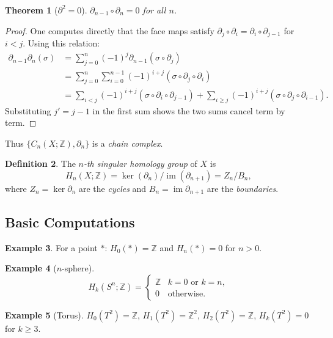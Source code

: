 \documentclass[12pt,a4paper]{amsart}
\newtheorem{theorem}{Theorem}[section]
\theoremstyle{definition}
\newtheorem{definition}[theorem]{Definition}
\newtheorem{example}[theorem]{Example}
\begin{document}
\begin{theorem}[$\partial^2 = 0$]
$\partial_{n-1} \circ \partial_n = 0$ for all $n$.
\end{theorem}
\begin{proof}
One computes directly that the face maps satisfy
$\partial_j \circ \partial_i = \partial_i \circ \partial_{j-1}$ for $i < j$.
Using this relation:
\begin{align*}
  \partial_{n-1}\partial_n(\sigma)
  &= \sum_{j=0}^n (-1)^j \partial_{n-1}(\sigma \circ \partial_j) \\
  &= \sum_{j=0}^n \sum_{i=0}^{n-1} (-1)^{i+j}
     (\sigma \circ \partial_j \circ \partial_i) \\
  &= \sum_{i < j} (-1)^{i+j}(\sigma \circ \partial_i \circ \partial_{j-1})
   + \sum_{i \geq j} (-1)^{i+j}(\sigma \circ \partial_j \circ \partial_{i-1}).
\end{align*}
Substituting $j' = j-1$ in the first sum shows the two sums cancel term by term.
\end{proof}

Thus $\{C_n(X;\mathbb{Z}), \partial_n\}$ is a \emph{chain complex}.

\begin{definition}
The \emph{$n$-th singular homology group} of $X$ is
\[
  H_n(X;\mathbb{Z})
  = \ker(\partial_n) / \operatorname{im}(\partial_{n+1})
  = Z_n / B_n,
\]
where $Z_n = \ker \partial_n$ are the \emph{cycles} and
$B_n = \operatorname{im} \partial_{n+1}$ are the \emph{boundaries}.
\end{definition}

\subsection{Basic Computations}

\begin{example}
For a point $* $: $H_0(*) = \mathbb{Z}$ and $H_n(*) = 0$ for $n > 0$.
\end{example}

\begin{example}[$n$-sphere]
\[
  H_k(S^n;\mathbb{Z}) = \begin{cases}
    \mathbb{Z} & k = 0 \text{ or } k = n, \\
    0 & \text{otherwise.}
  \end{cases}
\]
\end{example}

\begin{example}[Torus]
$H_0(T^2) = \mathbb{Z}$, $H_1(T^2) = \mathbb{Z}^2$, $H_2(T^2) = \mathbb{Z}$,
$H_k(T^2) = 0$ for $k \geq 3$.
\end{example}
\end{document}
